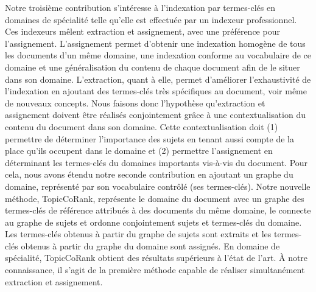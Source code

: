     Notre troisième contribution s'intéresse à l'indexation par termes-clés en
    domaines de spécialité telle qu'elle est effectuée par un indexeur
    professionnel. Ces indexeurs mêlent extraction et assignement, avec une
    préférence pour l'assignement. L'assignement permet d'obtenir une indexation
    homogène de tous les documents d'un même domaine, une indexation conforme au
    vocabulaire de ce domaine et une généralisation du contenu de chaque
    document afin de le situer dans son domaine. L'extraction, quant à elle,
    permet d'améliorer l'exhaustivité de l'indexation en ajoutant des
    termes-clés très spécifiques au document, voir même de nouveaux concepts.
    Nous faisons donc l'hypothèse qu'extraction et assignement doivent être
    réalisés conjointement grâce à une contextualisation du contenu du
    document dans son domaine. Cette contextualisation doit (1) permettre de
    déterminer l'importance des sujets en tenant aussi compte de la place qu'ils
    occupent dans le domaine et (2) permettre l'assignement en déterminant les
    termes-clés du domaines importants vis-à-vis du document.
    Pour cela, nous avons étendu notre seconde contribution en ajoutant un
    graphe du domaine, représenté par son vocabulaire contrôlé (ses
    termes-clés). Notre nouvelle méthode, TopicCoRank, représente le domaine du
    document avec un graphe des termes-clés de référence attribués à des
    documents du même domaine, le connecte au graphe de sujets et ordonne
    conjointement sujets et termes-clés du domaine. Les termes-clés obtenus à
    partir du graphe de sujets sont extraits et les termes-clés obtenus à partir
    du graphe du domaine sont assignés. En domaine de spécialité, TopicCoRank
    obtient des résultats supérieurs à l'état de l'art. À notre connaissance, il
    s'agit de la première méthode capable de réaliser simultanément
    extraction et assignement.

